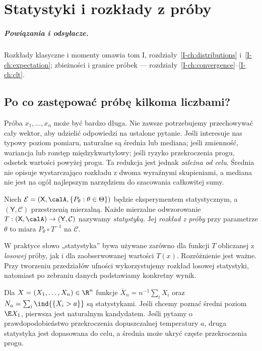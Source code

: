 \chapter{Statystyki i rozkłady z próby}
\label{ch:statystyki}
\paragraph{Powiązania i odsyłacze.} Rozkłady klasyczne i momenty omawia tom I, rozdziały~\ref{I-ch:distributions} i~\ref{I-ch:expectation}; zbieżności i granice próbek — rozdziały~\ref{I-ch:convergence}--\ref{I-ch:clt}.

\section{Po co zastępować próbę kilkoma liczbami?}
Próba $x_1,\ldots,x_n$ może być bardzo długa. Nie zawsze potrzebujemy przechowywać cały wektor, aby udzielić odpowiedzi na ustalone pytanie. Jeśli interesuje nas typowy poziom pomiaru, naturalne są średnia lub mediana; jeśli zmienność, wariancja lub rozstęp międzykwartylowy; jeśli ryzyko przekroczenia progu, odsetek wartości powyżej progu. Ta redukcja jest jednak \emph{zależna od celu}. Średnia nie opisuje wystarczająco rozkładu z dwoma wyraźnymi skupieniami, a mediana nie jest na ogół najlepszym narzędziem do szacowania całkowitej sumy.

\begin{definicja}\label{def:statistic}
Niech $\mathcal E=(\mathsf X,\calA,\{P_\theta:\theta\in\Theta\})$ będzie eksperymentem statystycznym, a $(\mathsf Y,\mathcal C)$ przestrzenią mierzalną. Każde mierzalne odwzorowanie $T:(\mathsf X,\calA)\to(\mathsf Y,\mathcal C)$ nazywamy \emph{statystyką}. Jej \emph{rozkład z próby} przy parametrze $\theta$ to miara $P_\theta\circ T^{-1}$ na $\mathcal C$.
\end{definicja}

W praktyce słowo „statystyka” bywa używane zarówno dla funkcji $T$ obliczanej z \emph{losowej} próby, jak i dla zaobserwowanej wartości $T(x)$. Rozróżnienie jest ważne. Przy tworzeniu przedziałów ufności wykorzystujemy rozkład losowej statystyki, natomiast po zebraniu danych podstawiamy konkretny wynik.

\begin{przyklad}
Dla $X=(X_1,\ldots,X_n)\in\R^n$ funkcje $\overline X_n=n^{-1}\sum_iX_i$ oraz $N_a=\sum_i\ind{\{X_i>a\}}$ są statystykami. Jeśli chcemy poznać średni poziom $\E X_1$, pierwsza jest naturalnym kandydatem. Jeśli pytamy o prawdopodobieństwo przekroczenia dopuszczalnej temperatury $a$, druga statystyka jest dopasowana do celu, a średnia może ukryć częste przekroczenia progu.
\end{przyklad}

